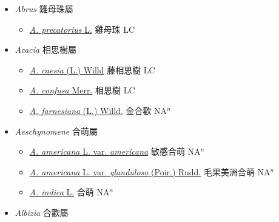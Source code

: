 
  \begin{itemize}
 \item[] \textit{Abrus} 雞母珠屬
                    
  \begin{itemize}
        \item[] \href{http://www.theplantlist.org/tpl1.1/search?q=Abrus+precatorius}{\textit{A. precatorius} L.}   雞母珠 LC
  \end{itemize}
 \item[] \textit{Acacia} 相思樹屬
                    
  \begin{itemize}
        \item[] \href{http://www.theplantlist.org/tpl1.1/search?q=Acacia+caesia}{\textit{A. caesia} (L.) Willd}   藤相思樹 LC
        \item[] \href{http://www.theplantlist.org/tpl1.1/search?q=Acacia+confusa}{\textit{A. confusa} Merr.}   相思樹 LC
        \item[] \href{http://www.theplantlist.org/tpl1.1/search?q=Acacia+farnesiana}{\textit{A. farnesiana} (L.) Willd.}   金合歡 NA$^n$
  \end{itemize}
 \item[] \textit{Aeschynomene} 合萌屬
                    
  \begin{itemize}
        \item[] \href{http://www.theplantlist.org/tpl1.1/search?q=Aeschynomene+americana+var.+americana}{\textit{A. americana} L. var. \textit{americana}}   敏感合萌 NA$^n$
        \item[] \href{http://www.theplantlist.org/tpl1.1/search?q=Aeschynomene+americana+var.+glandulosa}{\textit{A. americana} L. var. \textit{glandulosa} (Poir.) Rudd.}   毛果美洲合萌 NA$^n$
        \item[] \href{http://www.theplantlist.org/tpl1.1/search?q=Aeschynomene+indica}{\textit{A. indica} L.}   合萌 NA$^n$
  \end{itemize}
 \item[] \textit{Albizia} 合歡屬
                    

\end{itemize}
